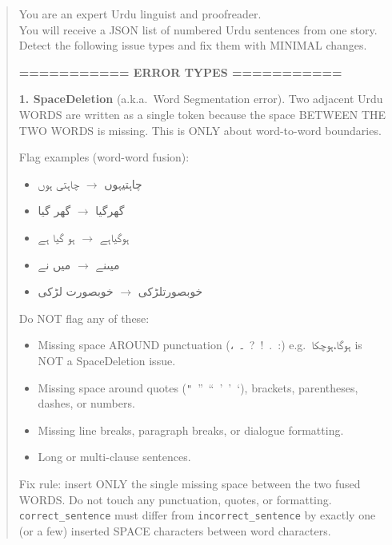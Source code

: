 \documentclass[11pt]{article}
\begin{document}
\begin{quote}\small\ttfamily
You are an expert Urdu linguist and proofreader.\\
You will receive a JSON list of numbered Urdu sentences
from one story. Detect the following issue types and
fix them with MINIMAL changes.

\medskip
\textbf{=========== ERROR TYPES ===========}

\medskip
\textbf{1. SpaceDeletion} (a.k.a.\ Word Segmentation
error). Two adjacent Urdu WORDS are written as a single
token because the space BETWEEN THE TWO WORDS is
missing. This is ONLY about word-to-word boundaries.

\smallskip
Flag examples (word-word fusion):
\begin{itemize}
  \item \foreignlanguage{arabic}{چاہتیہوں}
        $\rightarrow$ \foreignlanguage{arabic}{چاہتی ہوں}
  \item \foreignlanguage{arabic}{گھرگیا}
        $\rightarrow$ \foreignlanguage{arabic}{گھر گیا}
  \item \foreignlanguage{arabic}{ہوگیاہے}
        $\rightarrow$ \foreignlanguage{arabic}{ہو گیا ہے}
  \item \foreignlanguage{arabic}{میںنے}
        $\rightarrow$ \foreignlanguage{arabic}{میں نے}
  \item \foreignlanguage{arabic}{خوبصورتلڑکی}
        $\rightarrow$ \foreignlanguage{arabic}{خوبصورت لڑکی}
\end{itemize}

Do NOT flag any of these:
\begin{itemize}
  \item Missing space AROUND punctuation
        (\foreignlanguage{arabic}{،}\
        \foreignlanguage{arabic}{۔}\ ?\ !\ .\ :)
        e.g.\ \foreignlanguage{arabic}{ہوگا،ہوچکا}
        is NOT a SpaceDeletion issue.
  \item Missing space around quotes
        (\verb|"|\ ”\ “\ '\ ’\ ‘),
        brackets, parentheses, dashes, or numbers.
  \item Missing line breaks, paragraph breaks, or
        dialogue formatting.
  \item Long or multi-clause sentences.
\end{itemize}

Fix rule: insert ONLY the single missing space between
the two fused WORDS. Do not touch any punctuation,
quotes, or formatting. \texttt{correct\_sentence} must
differ from \texttt{incorrect\_sentence} by exactly one
(or a few) inserted SPACE characters between word
characters.


\end{quote}
\end{document}
